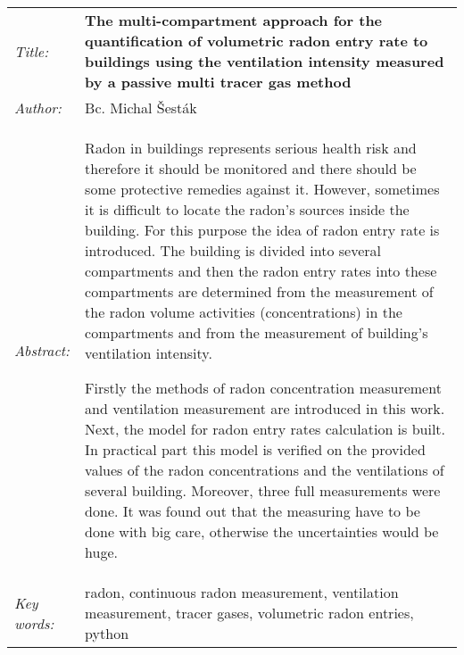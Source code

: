 \begin{tabularx}{\textwidth}{>{\itshape}l X}
  Title: & \textbf{The multi-compartment approach for the quantification of volumetric radon entry rate to buildings using the ventilation intensity measured by a passive multi tracer gas method}\\
  Author: & Bc. Michal Šesták\\
  Abstract: & Radon in buildings represents serious health risk and therefore it should be monitored and there should be some protective remedies against it. However, sometimes it is difficult to locate the radon's sources inside the building. For this purpose the idea of radon entry rate is introduced. The building is divided into several compartments and then the radon entry rates into these compartments are determined from the measurement of the radon volume activities (concentrations) in the compartments and from the measurement of building's ventilation intensity. 

      Firstly the methods of radon concentration measurement and ventilation measurement are introduced in this work. Next, the model for radon entry rates calculation is built. In practical part this model is verified on the provided values of the radon concentrations and the ventilations of several building. Moreover, three full measurements were done. It was found out that the measuring have to be done with big care, otherwise the uncertainties would be huge.\\
  Key words: & radon, continuous radon measurement, ventilation measurement, tracer gases, volumetric radon entries, python 
\end{tabularx}
\newpage 
